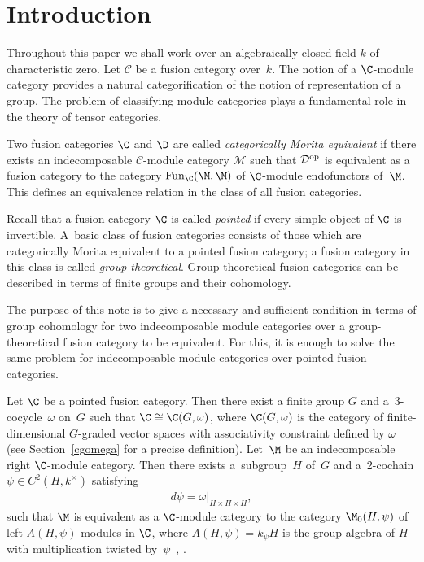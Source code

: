 \section{Introduction}

Throughout this paper we shall work over an algebraically closed f\/ield $k$ of characteristic zero. Let $\mathcal{C}$ be a fusion category over~$k$. The notion of a $\C$-module category provides a natural categorif\/ication of the notion of representation of a group. The problem of classifying module categories plays a fundamental role in the theory of tensor categories.

Two fusion categories $\C$ and $\D$ are called \emph{categorically Morita equivalent} if there exists an indecomposable $\mathcal{C}$-module category $\mathcal{M}$ such that $\mathcal{D}^{\rm op}$ is equivalent as a fusion category to the category $\operatorname{Fun}_\C(\M, \M)$ of $\C$-module endofunctors of~$\M$. This def\/ines an equivalence relation in the class of all fusion categories.

Recall that a fusion category $\C$ is called \emph{pointed} if every simple object of $\C$ is invertible. A~basic class of fusion categories consists of those which are categorically Morita equivalent to a pointed fusion category; a fusion category in this class is called \emph{group-theoretical}. Group-theoretical fusion categories can be described in terms of f\/inite groups and their cohomology.

The purpose of this note is to give a necessary and suf\/f\/icient condition in terms of group cohomology for two indecomposable module categories over a group-theoretical fusion category to be equivalent. For this, it is enough to solve the same problem for indecomposable module categories over pointed fusion categories.

Let $\C$ be a pointed fusion category. Then there exist a f\/inite group $G$ and a~3-cocycle~$\omega$ on~$G$ such that $\C \cong \C(G, \omega)$, where $\C(G, \omega)$ is the category of f\/inite-dimensional $G$-graded vector spaces with associativity constraint def\/ined by $\omega$ (see Section~\ref{cgomega} for a precise def\/inition). Let~$\M$ be an indecomposable right $\C$-module category. Then there exists a~subgroup~$H$ of~$G$ and a~2-cochain $\psi \in C^2(H, k^{\times})$ satisfying
\begin{gather}
\label{cond-alfa}d\psi = \omega\vert_{H \times H \times H},
\end{gather}
such that $\M$ is equivalent as a $\C$-module category to the category $\M_0(H, \psi)$ of left $A(H, \psi)$-modules in $\C$, where $A(H, \psi) = k_\psi H$ is the group algebra of $H$ with multiplication twisted by~$\psi$~\cite{ostrik}, \cite[Example~9.7.2]{egno}.

